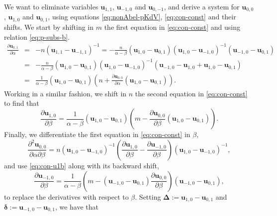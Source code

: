 \documentclass[dvips,10pt]{article}
\newcommand{\bs}{\boldsymbol}
\newcommand{\bsu}{ {\bs{u}}}
\theoremstyle{remark} %
\begin{document}
	We want to  eliminate variables $\bsu_{1,1}$, $\bsu_{-1,0}$ and $\bsu_{0,-1}$, and derive a system for $\bsu_{0,0}$, $\bsu_{1,0}$ and $\bsu_{0,1}$, using equations \eqref{eq:nonAbel-pKdV}, \eqref{eq:con-const} and their shifts. We start by shifting in $m$ the first equation in \eqref{eq:con-const} and using relation \eqref{eq:p-subs-b}. 
	\begin{eqnarray*}
		\frac{\partial {\bs{u}}_{0,1}}{\partial \alpha} &=&  -n \left({\bs{u}}_{1,1} -{\bs{u}}_{-1,1}\right)^{-1} = -\frac{n}{\alpha-\beta} \left({\bs{u}}_{1,0} -{\bs{u}}_{0,1}\right) \left({\bs{u}}_{1,0} -{\bs{u}}_{-1,0}\right)^{-1} \left({\bs{u}}_{-1,0} -{\bs{u}}_{0,1}\right)\\
		&=& -\frac{n}{\alpha-\beta} \left({\bs{u}}_{1,0} -{\bs{u}}_{0,1}\right)\left({\bs{u}}_{1,0} -{\bs{u}}_{-1,0}\right)^{-1}  \left( {\bs{u}}_{-1,0} -  {\bs{u}}_{1,0}+ {\bs{u}}_{1,0} -{\bs{u}}_{0,1} \right) \\
		&=&\frac{1}{\alpha-\beta} \left({\bs{u}}_{1,0} -{\bs{u}}_{0,1}\right) \left(n+ \frac{\partial {\bs{u}}_{0,0}}{\partial \alpha}  \left( {\bs{u}}_{1,0} -{\bs{u}}_{0,1} \right)\right).
	\end{eqnarray*} 
	Working in a similar fashion, we shift in $n$ the second equation in \eqref{eq:con-const} to find that
	\begin{equation} \label{eq:con-u1b}
		\frac{\partial {\bs{u}}_{1,0}}{\partial \beta} =\frac{1}{\alpha-\beta} \left({\bs{u}}_{1,0} -{\bs{u}}_{0,1}\right) \left(m - \frac{\partial {\bs{u}}_{0,0}}{\partial \beta}  \left( {\bs{u}}_{1,0} -{\bs{u}}_{0,1} \right)\right).
	\end{equation}
	Finally, we differentiate the first equation in \eqref{eq:con-const} in $\beta$,
	\begin{equation} \label{eq:con-uab}
		\frac{\partial^2 {\bs{u}}_{0,0}}{\partial \alpha \partial \beta} = n \left({\bs{u}}_{1,0} -{\bs{u}}_{-1,0}\right)^{-1} \left( \frac{\partial {\bs{u}}_{1,0}}{\partial \beta}  - \frac{\partial {\bs{u}}_{-1,0}}{\partial \beta}  \right) \left({\bs{u}}_{1,0} -{\bs{u}}_{-1,0}\right)^{-1},
	\end{equation}
	and use \eqref{eq:con-u1b} along with its backward shift, 
	$$	\frac{\partial {\bs{u}}_{-1,0}}{\partial \beta} =\frac{1}{\alpha-\beta}  \left(m -   \left( {\bs{u}}_{-1,0} -{\bs{u}}_{0,1} \right) \frac{\partial {\bs{u}}_{0,0}}{\partial \beta} \right) \left( {\bs{u}}_{-1,0} -{\bs{u}}_{0,1} \right) , $$
	to replace the derivatives with respect to $\beta$. Setting ${\bs{\Delta}} := {\bs{u}}_{1,0} -{\bs{u}}_{0,1}$ and ${\bs{\delta}} :=  {\bs{u}}_{-1,0} -{\bs{u}}_{0,1}$, we have that
\end{document}
